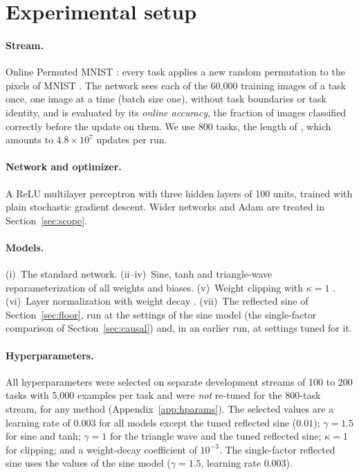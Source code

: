 \documentclass[11pt,a4paper]{article}
\begin{document}
\section{Experimental setup}\label{sec:setup}

\paragraph{Stream.} Online Permuted MNIST \citep{goodfellow2013empirical,zenke2017continual,dohare2024loss}:
every task applies a new random permutation to the pixels of MNIST \citep{lecun1998gradient}. The network sees
each of the 60{,}000 training images of a task once, one image at a time (batch size one), without task
boundaries or task identity, and is evaluated by its \emph{online accuracy}, the fraction of images classified
correctly before the update on them. We use 800 tasks, the length of \citet{dohare2024loss}, which amounts to
$4.8\times10^7$ updates per run.

\paragraph{Network and optimizer.} A ReLU multilayer perceptron with three hidden layers of 100 units, trained
with plain stochastic gradient descent. Wider networks and Adam \citep{kingma2015adam} are treated in
Section~\ref{sec:scope}.

\paragraph{Models.} (i)~The standard network. (ii--iv)~Sine, tanh and triangle-wave reparameterization of all
weights and biases. (v)~Weight clipping with $\kappa=1$ \citep{elsayed2024weight}. (vi)~Layer normalization
\citep{ba2016layer} with weight decay \citep{lyle2024disentangling}. (vii)~The reflected sine
of Section~\ref{sec:floor}, run at the settings of the sine model (the single-factor comparison of
Section~\ref{sec:causal}) and, in an earlier run, at settings tuned for it.

\paragraph{Hyperparameters.} All hyperparameters were selected on separate development streams of 100 to 200
tasks with 5{,}000 examples per task and were \emph{not} re-tuned for the 800-task stream, for any method
(Appendix~\ref{app:hparams}). The selected values are a learning rate of $0.003$ for all models except the
tuned reflected sine ($0.01$); $\gamma=1.5$ for sine and tanh; $\gamma=1$ for the triangle wave and the tuned
reflected sine; $\kappa=1$ for clipping; and a weight-decay coefficient of $10^{-3}$. The single-factor
reflected sine uses the values of the sine model ($\gamma=1.5$, learning rate $0.003$).
\end{document}
